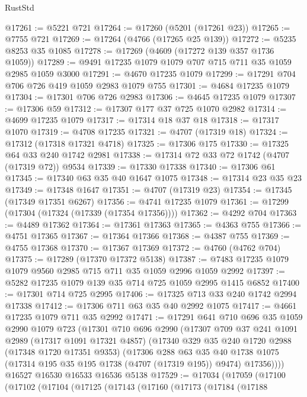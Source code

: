 \begin{lexlean}{RustStd}
\begin{coremodule}
{\begin{coremodule}
{{{{{{{{{{{{{{{{{{{{{{{{{{{{{{{{{{{@17261 := @5221 @721
@17264 := @17260 (@5201 (@17261 @23))
@17265 := @7755 @721
@17269 := @17264 (@4766 (@17265 @25 @139))
@17272 := @5235 @8253 @35 @1085
@17278 := @17269 (@4609 (@17272 @139 @357 @1736 @1059))
@17289 := @9491 @17235 @1079 @1079 @707 @715 @711 @35 @1059 @2985 @1059 @3000
@17291 := @4670 @17235 @1079
@17299 := @17291 @704 @706 @726 @419 @1059 @2983 @1079 @755
@17301 := @4684 @17235 @1079
@17304 := @17301 @706 @726 @2983
@17306 := @4645 @17235 @1079
@17307 := @17306 @59
@17312 := @17307 @177 @37 @725 @1070 @2982
@17314 := @4699 @17235 @1079
@17317 := @17314 @18 @37 @18
@17318 := @17317 @1070
@17319 := @4708 @17235
@17321 := @4707 (@17319 @18)
@17324 := @17312 (@17318 @17321 @4718)
@17325 := @17306 @175
@17330 := @17325 @64 @33 @240 @1742 @2981
@17338 := @17314 @72 @33 @72 @1742 (@4707 (@17319 @72)) @9534
@17339 := @17330 @17338
@17340 := @17306 @61
@17345 := @17340 @63 @35 @40 @1647 @1075
@17348 := @17314 @23 @35 @23
@17349 := @17348 @1647
@17351 := @4707 (@17319 @23)
@17354 := @17345 (@17349 @17351 @6267)
@17356 := @4741 @17235 @1079
@17361 := @17299 (@17304 (@17324 (@17339 (@17354 @17356))))
@17362 := @4292 @704
@17363 := @4489 @17362
@17364 := @17361 @17363
@17365 := @4363 @755
@17366 := @4751 @17365
@17367 := @17364 @17366
@17368 := @4387 @755
@17369 := @4755 @17368
@17370 := @17367 @17369
@17372 := @4760 (@4762 @704)
@17375 := @17289 (@17370 @17372 @5138)
@17387 := @7483 @17235 @1079 @1079 @9560 @2985 @715 @711 @35 @1059 @2996 @1059 @2992
@17397 := @5282 @17235 @1079 @139 @35 @714 @725 @1059 @2995 @1415 @6852
@17400 := @17301 @714 @725 @2995
@17406 := @17325 @713 @33 @240 @1742 @2994 @17338
@17412 := @17306 @711 @63 @35 @40 @2992 @1075
@17417 := @4661 @17235 @1079 @711 @35 @2992
@17471 := @17291
    @641
    @710
    @696
    @35
    @1059
    @2990
    @1079
    @723
    (@17301
      @710
      @696
      @2990
      (@17307
        @709
        @37
        @241
        @1091
        @2989
        (@17317 @1091 @17321 @4857)
        (@17340
          @329
          @35
          @240
          @1720
          @2988
          (@17348 @1720 @17351 @9353)
          (@17306
            @288
            @63
            @35
            @40
            @1738
            @1075
            (@17314 @195 @35 @195 @1738 (@4707 (@17319 @195)) @9474)
            @17356))))
    @16527
    @16530
    @16533
    @16536
    @5138
@17529 := @17034
    (@17059
      (@17100
        (@17102
          (@17104
            (@17125
              (@17143
                (@17160
                  (@17173
                    (@17184
                      (@17188
}}}}}}}}}}}}}}}}}}}}}}}}}}}}}}}}}}}
\end{coremodule}}
\end{coremodule}
\end{lexlean}
